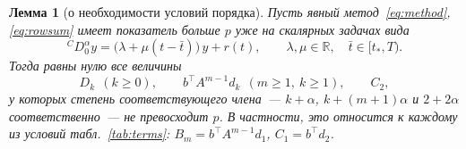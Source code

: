 \documentclass[11pt,a4paper]{article}
\theoremstyle{plain}
\newtheorem{lemma}{Лемма}
\theoremstyle{definition}
\begin{document}
\begin{lemma}[о необходимости условий порядка]\label{lem:necessity}
Пусть явный метод~\eqref{eq:method}, \eqref{eq:rowsum} имеет показатель больше $p$ уже на скалярных задачах вида
\begin{equation}\label{eq:testlin}
{}^{C}\!D^{\alpha}_{0}y=\bigl(\lambda+\mu(t-\bar t)\bigr)\,y+r(t),\qquad \lambda,\mu\in\mathbb R,\quad \bar t\in[t_*,T).
\end{equation}
Тогда равны нулю все величины
\[
D_k\ \ (k\ge0),\qquad b^{\top}A^{m-1}d_k\ \ (m\ge1,\ k\ge1),\qquad C_2,
\]
у которых степень соответствующего члена~--- $k+\alpha$, $k+(m+1)\alpha$ и $2+2\alpha$ соответственно~--- не превосходит $p$. В частности, это относится к каждому из условий табл.~\ref{tab:terms}: $B_m=b^{\top}A^{m-1}d_1$, $C_1=b^{\top}d_2$.
\end{lemma}
\end{document}

